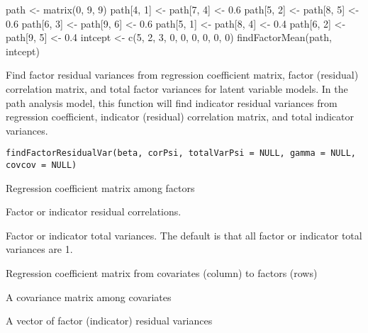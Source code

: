 \documentclass[a4paper]{book}
\begin{document}
%
\begin{Examples}
\begin{ExampleCode}
path <- matrix(0, 9, 9)
path[4, 1] <- path[7, 4] <- 0.6
path[5, 2] <- path[8, 5] <- 0.6
path[6, 3] <- path[9, 6] <- 0.6
path[5, 1] <- path[8, 4] <- 0.4
path[6, 2] <- path[9, 5] <- 0.4
intcept <- c(5, 2, 3, 0, 0, 0, 0, 0, 0)
findFactorMean(path, intcept)
\end{ExampleCode}
\end{Examples}
%
\begin{Description}\relax
Find factor residual variances from regression coefficient matrix, factor (residual) correlation matrix, and total factor variances  for latent variable models. In the path analysis model, this function will find indicator residual variances from regression coefficient, indicator (residual) correlation matrix, and total indicator variances. 
\end{Description}
%
\begin{Usage}
\begin{verbatim}
findFactorResidualVar(beta, corPsi, totalVarPsi = NULL, gamma = NULL, covcov = NULL)
\end{verbatim}
\end{Usage}
%
\begin{Arguments}
\begin{ldescription}
\item[\code{beta}] 
Regression coefficient matrix among factors

\item[\code{corPsi}] 
Factor or indicator residual correlations.

\item[\code{totalVarPsi}] 
Factor or indicator total variances. The default is that all factor or indicator total variances are 1. 

\item[\code{gamma}] 
Regression coefficient matrix from covariates (column) to factors (rows)

\item[\code{covcov}] 
A covariance matrix among covariates

\end{ldescription}
\end{Arguments}
%
\begin{Value}
A vector of factor (indicator) residual variances
\end{Value}
\end{document}
